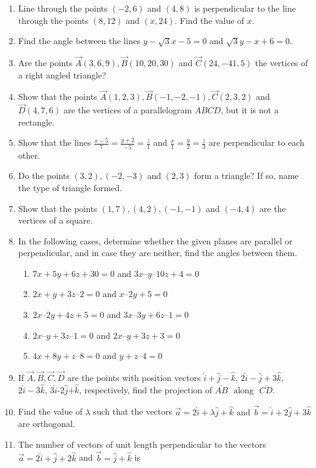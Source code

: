 \begin{enumerate}[label=\thesubsection.\arabic*, ref=\thesubsection.\theenumi]
\item Line through the points $(-2,6)$ and $(4,8)$ is perpendicular to the line through the points $(8,12)$ and $(x,24)$. Find the value of $x$.
\item Find the angle between the lines $y-\sqrt 3x-5=0$ and $\sqrt 3y-x+6=0$.
\item Are the points $\vec{A}(3,6,9), \vec{B}(10,20,30)$ and $\vec{C}(24,-41,5)$ the vertices of a right angled triangle?
\item Show that the points $\vec{A}(1,2,3), \vec{B}(-1,-2,-1), \vec{C}(2,3,2)$ and $\vec{D}(4,7,6)$ are the vertices of a parallelogram $ABCD$, but it is not a rectangle.
\item Show that the lines $ \frac{x-5}{7}=\frac{y+2}{-5}=\frac{z}{1}$ and $ \frac{x}{1}=\frac{y}{2}=\frac{z}{3}$ are perpendicular to each other.
\item Do the points $(3,2), (-2,-3)$ and $(2,3)$ form a triangle? If so, name the type of triangle formed.
\item Show that the points $(1,7),(4,2),(-1,-1)$ and $(-4,4)$ are the vertices of a square.
\item In the following cases,  determine whether the given planes are parallel or perpendicular,  and in case they are neither,  find the angles between them.
\begin{enumerate}
\item $7x + 5y + 6z + 30 = 0$ and $3x – y – 10z + 4 = 0$
\item $2x + y + 3z – 2 = 0$ and $x – 2y + 5 = 0$
\item $2x – 2y + 4z + 5 = 0$ and $3x – 3y + 6z – 1 = 0$
\item $2x – y + 3z – 1 = 0$ and $2x – y + 3z + 3 = 0$
\item $4x + 8y + z – 8 = 0$ and $y + z – 4 = 0$
\end{enumerate}
    \solution
		
\item If $\vec{A}, \vec{B}, \vec{C}, \vec{D}$  are the points with position vectors $\hat{i}+\hat{j}-\hat{k}$,  $2\hat{i}-\hat{j}+3\hat{k}$,  $2\hat{i}-3\hat{k}$,  $3\hat{i}$-$2\hat{j}$+$\hat{k}$,  respectively,  find the projection of $\overline{AB}$ $\text{ along }$ $\overline{CD}$.
\item Find the value of $\lambda$ such that the vectors $\vec{a}=2\hat{i}+\lambda\hat{j}+\hat{k}$ $\text{and}$ $\vec{b}=\hat{i}+2\hat{j}+3\hat{k}$ are orthogonal.
\item The number of vectors of unit length perpendicular to the vectors $\vec{a}=2\hat{i}+\hat{j}+2\hat{k}$  and  $\vec{b}=\hat{j}+\hat{k}$ is

\end{enumerate}
